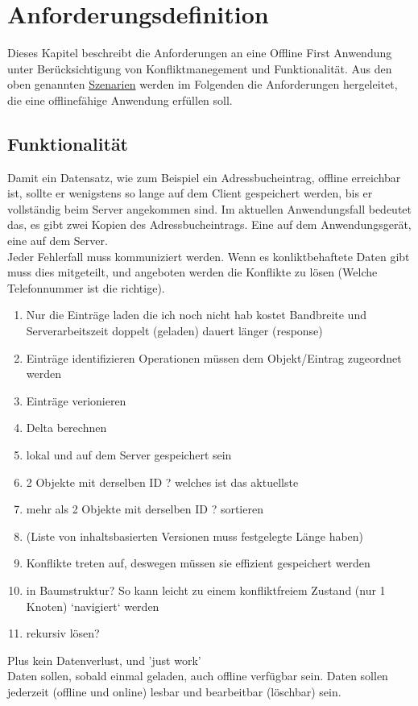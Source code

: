 \chapter{\label{chap:anforderungen}Anforderungsdefinition}
Dieses Kapitel beschreibt die Anforderungen an eine Offline First Anwendung unter Berücksichtigung von Konfliktmanegement und Funktionalität.  Aus den oben genannten \hyperref[chap:szenarien]{Szenarien} werden im Folgenden die Anforderungen hergeleitet, die eine offlinefähige Anwendung  erfüllen soll.
%
%

%
%
\section{Funktionalität}
Damit ein Datensatz, wie zum Beispiel ein Adressbucheintrag, offline erreichbar ist, sollte er wenigstens so lange auf dem Client gespeichert werden, bis er vollständig beim Server angekommen sind. Im aktuellen Anwendungsfall bedeutet das, es gibt zwei Kopien des Adressbucheintrags. Eine auf dem Anwendungsgerät, eine auf dem Server.\\
Jeder Fehlerfall muss kommuniziert werden. Wenn es konliktbehaftete Daten gibt muss dies mitgeteilt, und angeboten werden die Konflikte zu lösen (Welche Telefonnummer ist die richtige).\\
\begin{enumerate}
  \item Nur die Einträge laden die ich noch nicht hab
    \subitem kostet Bandbreite und Serverarbeitszeit
    \subitem doppelt (geladen)
    \subitem dauert länger (response)
  \item Einträge identifizieren
    \subitem Operationen müssen dem Objekt/Eintrag zugeordnet werden
  \item Einträge verionieren
  \item Delta berechnen
  \item lokal und auf dem Server gespeichert sein
  \item 2 Objekte mit derselben ID ? welches ist das aktuellste
  \item mehr als 2 Objekte mit derselben ID ? sortieren
  \item (Liste von inhaltsbasierten Versionen muss festgelegte Länge haben)
  \item Konflikte treten auf, deswegen müssen sie effizient gespeichert werden
  \item in Baumstruktur? So kann leicht zu einem konfliktfreiem Zustand (nur 1 Knoten) `navigiert` werden
  \item rekursiv lösen?
\end{enumerate}
 Plus kein Datenverlust, und 'just work'\\
Daten sollen, sobald einmal geladen, auch offline verfügbar sein.
Daten sollen jederzeit (offline und online) lesbar und bearbeitbar (löschbar) sein.
%
%
